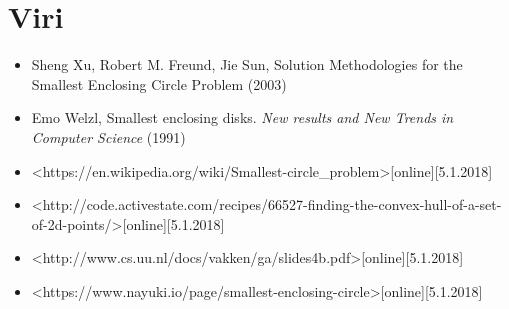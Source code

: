 \documentclass[a4paper]{article}
\begin{document}
\section{Viri}
\begin{itemize}
\item Sheng Xu, Robert M. Freund, Jie Sun, Solution Methodologies for the Smallest Enclosing Circle Problem (2003)
\item Emo Welzl, Smallest enclosing disks. \textit{New results and New Trends in Computer Science} (1991)  
\item <https://en.wikipedia.org/wiki/Smallest-circle\_problem>[online][5.1.2018]
\item <http://code.activestate.com/recipes/66527-finding-the-convex-hull-of-a-set-of-2d-points/>[online][5.1.2018]
\item  <http://www.cs.uu.nl/docs/vakken/ga/slides4b.pdf>[online][5.1.2018]
\item  <https://www.nayuki.io/page/smallest-enclosing-circle>[online][5.1.2018]
\end{itemize}
\end{document}
